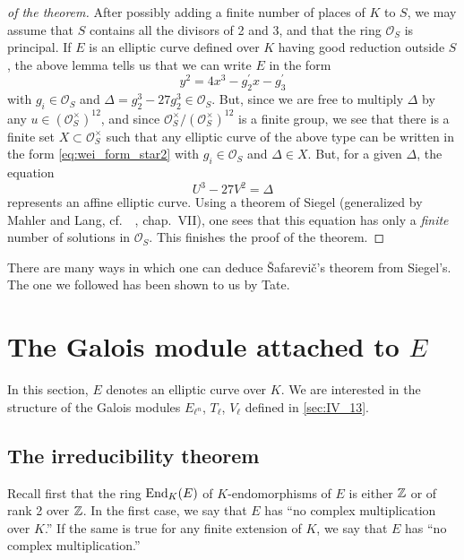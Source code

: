 \begin{proof}[ of the theorem]
After possibly adding a finite number of places of $K$ to $S$, we may assume
that $S$ contains all the divisors of 2 and 3, and that the ring
$\mathcal{O}_S$ is principal. If $E$ is an elliptic curve defined over $K$
having good reduction outside $S$, the above lemma tells us that we can write
$E$ in the form
\begin{equation}
	y^2 = 4x^3 - g_2^\prime x - g_3^\prime
	\tag{$*$}
	\label{eq:wei_form_star2}
\end{equation}
with $g_i \in \mathcal{O}_S$ and $\Delta = g_2^3 - 27 g_2^3 \in \mathcal{O}_S$.
But, since we are free to multiply $\Delta$ by any $u \in
{(\mathcal{O}_S^\times)}^{12}$, and since
$\mathcal{O}_S^\times/{(\mathcal{O}_S^\times)}^{12}$ is a finite group, we see
that there is a finite set $X \subset \mathcal{O}_S^\times$ such that any
elliptic
\dpage
curve of the above type can be written in the form \eqref{eq:wei_form_star2}
with $g_i \in \mathcal{O}_S$ and $\Delta \in X$. But, for a given $\Delta$, the
equation
\[
	U^3 - 27V^2 = \Delta
\]
represents an affine elliptic curve. Using a theorem of Siegel (generalized by
Mahler and Lang, cf.\ \citeauthor{14}~\cite{14}, chap.~VII), one sees that this
equation has only a \emph{finite} number of solutions in $\mathcal{O}_S$. This
finishes the proof of the theorem.
\end{proof}

\begin{obs}
There are many ways in which one can deduce \v Safarevi\v c's theorem from
Siegel's. The one we followed has been shown to us by Tate.
\end{obs}

\section{The Galois module attached to $E$}
In this section, $E$ denotes an elliptic curve over $K$. We are
interested in the structure of the Galois modules $E_{\ell^n}$, $T_\ell$, $V_\ell$
defined in \ref{sec:IV_13}.

\subsection{The irreducibility theorem}
\label{sec:IV_21}
Recall first that the ring $\operatorname{End}_K(E)$ of $K$-endomorphisms of $E$
is either $\mathbb{Z}$ or of rank 2 over $\mathbb{Z}$. In the first case, we say that $E$
has ``no complex multiplication over $K$.'' If the same is true for any
finite extension of $K$, we say that $E$ has ``no complex 
multiplication.''

